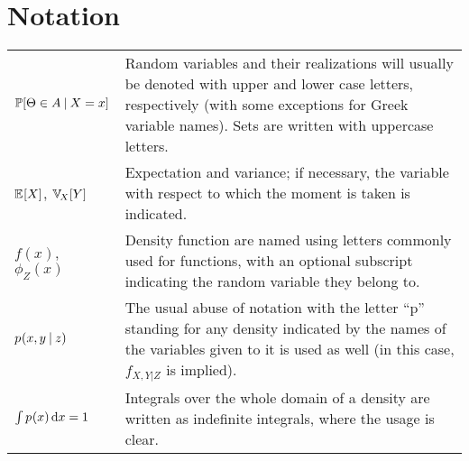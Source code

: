 \chapter*{Notation}
\label{cha:notation}

\begin{center}
  \renewcommand{\arraystretch}{1.5}
  \begin{tabular}{lp{}}
    \(\mathbb{P}[\Theta \in A \:\vert\: X = x]\) & Random variables and their realizations will usually be
                                           denoted with upper and lower case letters, respectively
                                           (with some exceptions for Greek variable names).  Sets
                                           are written with uppercase letters.\\
    \(\Exp{X}\), \(\Var[X]{Y}\) & Expectation and variance; if necessary, the variable with respect
                                  to which the moment is taken is indicated. \\
    \(f(x)\), \(\phi_Z(x)\) & Density function are named using letters commonly used for functions,
                              with an optional subscript indicating the random variable they belong
                              to. \\
    \(\prob{x, y \given z}\) & The usual abuse of notation with the letter \enquote{p} standing for
                               any density indicated by the names of the variables given to it is
                               used as well (in this case, \(f_{X,Y|Z}\) is implied). \\
    \(\int \prob{x} \dif x = 1\) & Integrals over the whole domain of a density are written as
                                   indefinite integrals, where the usage is clear.
  \end{tabular}
\end{center}

